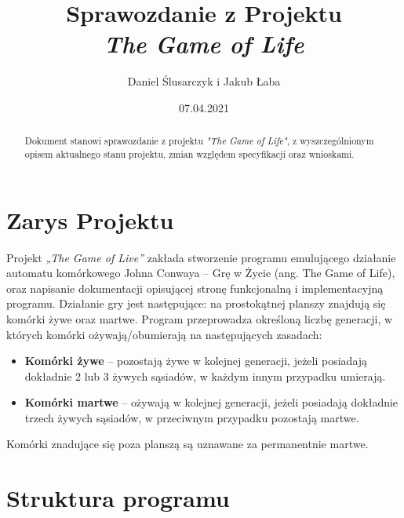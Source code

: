 \documentclass[11pt,a4paper]{report}
\title{\Huge Sprawozdanie z Projektu\\\textsl{The Game of Life}}
\author{Daniel Ślusarczyk i Jakub Łaba}
\date{07.04.2021}
\begin{document}
\maketitle

\renewcommand*\thesection{\arabic{section}} 
\begin{abstract}
Dokument stanowi sprawozdanie z projektu \textsl{"The Game of Life"}, z wyszczególnionym opisem aktualnego stanu projektu, zmian względem specyfikacji oraz wnioskami.
\end{abstract}

\pagestyle{fancy}
\fancyhf{}
\setcounter{page}{0}

{
\fancyhead{} 
\fancyfoot{} 
}
\thispagestyle{empty} 
\tableofcontents 
\thispagestyle{empty}
\newpage

{
\fancyhead{} 
\fancyfoot[C]{\thepage}
}


\section{Zarys Projektu}\label{sec:tekst}
Projekt \textsl {„The Game of Live”} zakłada stworzenie programu emulującego działanie automatu komórkowego Johna Conwaya -- Grę w Życie (ang. The Game of Life), oraz napisanie dokumentacji opisującej stronę funkcjonalną i implementacyjną programu. Działanie gry jest następujące: na prostokątnej planszy znajdują się komórki żywe oraz martwe. Program przeprowadza określoną liczbę generacji, w których komórki ożywają/obumierają na następujących zasadach:
\begin {itemize}
\item\textbf {Komórki żywe} -- pozostają żywe w kolejnej generacji, jeżeli posiadają dokładnie 2 lub 3 żywych sąsiadów, w każdym innym przypadku umierają.
\item\textbf {Komórki martwe} -- ożywają w kolejnej generacji, jeżeli posiadają dokładnie trzech żywych sąsiadów, w przeciwnym przypadku pozostają martwe.
\end {itemize}
Komórki znadujące się poza planszą są uznawane za permanentnie martwe.


\section{Struktura programu}\label{sec:tekst}
\end{document}
